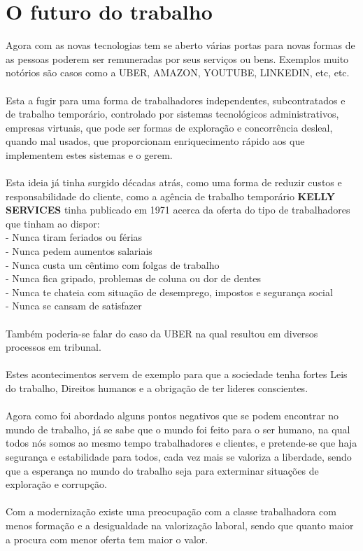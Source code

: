 \section{O futuro do trabalho}
\qquad Agora com as novas tecnologias tem se aberto várias portas para novas formas de as pessoas poderem ser remuneradas por seus serviços ou bens. Exemplos muito notórios são casos como a UBER, AMAZON, YOUTUBE, LINKEDIN, etc, etc.\\
\\
Esta a fugir para uma forma de trabalhadores independentes, subcontratados e de trabalho temporário, controlado por sistemas tecnológicos administrativos, empresas virtuais, que pode ser formas de exploração e concorrência desleal, quando mal usados, que proporcionam enriquecimento rápido aos que implementem estes sistemas e o gerem.\\
\\
Esta ideia já tinha surgido décadas atrás, como uma forma de reduzir custos e responsabilidade do cliente, como a agência de trabalho temporário \textbf{KELLY SERVICES} tinha publicado em 1971 acerca da oferta do tipo de trabalhadores que tinham ao dispor:\cite{book_11}\\
\hspace*{.5cm} - Nunca tiram feriados ou férias\\
\hspace*{.5cm} - Nunca pedem aumentos salariais\\
\hspace*{.5cm} - Nunca custa um cêntimo com folgas de trabalho\\
\hspace*{.5cm} - Nunca fica gripado, problemas de coluna ou dor de dentes\\
\hspace*{.5cm} - Nunca te chateia com situação de desemprego, impostos e segurança social\\
\hspace*{.5cm} - Nunca se cansam de satisfazer\\
\\
Também poderia-se falar do caso da UBER na qual resultou em diversos processos em tribunal.\\
\\ 
Estes acontecimentos servem de exemplo para que a sociedade tenha fortes Leis do trabalho, Direitos humanos e a obrigação de ter lideres conscientes.\\
\\
Agora como foi abordado alguns pontos negativos que se podem encontrar no mundo de trabalho, já se sabe que o mundo foi feito para o ser humano, na qual todos nós somos ao mesmo tempo trabalhadores e clientes, e pretende-se que haja segurança e estabilidade para todos, cada vez mais se valoriza a liberdade, sendo que a esperança no mundo do trabalho seja para exterminar situações de exploração e corrupção.\\
\\
Com a modernização existe uma preocupação com a classe trabalhadora com menos formação e a desigualdade na valorização laboral, sendo que quanto maior a procura com menor oferta tem maior o valor.
\newpage

